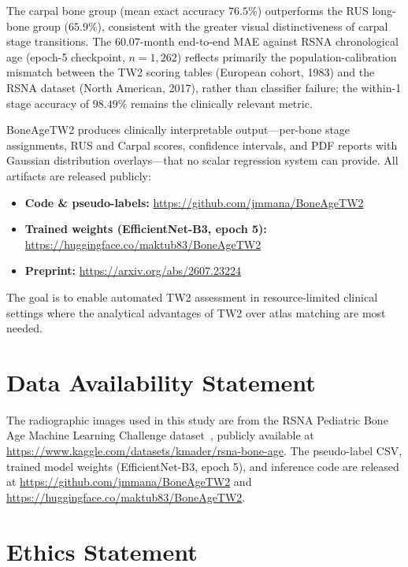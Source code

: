 \documentclass[journal]{IEEEtran}
\begin{document}
The carpal bone group (mean exact accuracy $76.5\%$)
outperforms the RUS long-bone group ($65.9\%$),
consistent with the greater visual distinctiveness of
carpal stage transitions.
The $60.07$-month end-to-end MAE against RSNA chronological age
(epoch-5 checkpoint, $n{=}1{,}262$) reflects primarily the
population-calibration mismatch between the TW2 scoring tables
(European cohort, 1983) and the RSNA dataset (North American, 2017),
rather than classifier failure; the within-1 stage accuracy of
$98.49\%$ remains the clinically relevant metric.

BoneAgeTW2 produces clinically interpretable output—per-bone
stage assignments, RUS and Carpal scores, confidence intervals,
and PDF reports with Gaussian distribution overlays—that no
scalar regression system can provide.
All artifacts are released publicly:
\begin{itemize}
  \item \textbf{Code \& pseudo-labels:}
        \url{https://github.com/jmmana/BoneAgeTW2}
  \item \textbf{Trained weights (EfficientNet-B3, epoch 5):}
        \url{https://huggingface.co/maktub83/BoneAgeTW2}
  \item \textbf{Preprint:}
        \url{https://arxiv.org/abs/2607.23224}
\end{itemize}
The goal is to enable automated TW2 assessment in resource-limited
clinical settings where the analytical advantages of TW2 over
atlas matching are most needed.

\section*{Data Availability Statement}

The radiographic images used in this study are from the RSNA Pediatric
Bone Age Machine Learning Challenge dataset~\cite{halabi2019}, publicly
available at \url{https://www.kaggle.com/datasets/kmader/rsna-bone-age}.
The pseudo-label CSV, trained model weights (EfficientNet-B3, epoch 5),
and inference code are released at
\url{https://github.com/jmmana/BoneAgeTW2} and
\url{https://huggingface.co/maktub83/BoneAgeTW2}.

\section*{Ethics Statement}
\end{document}
